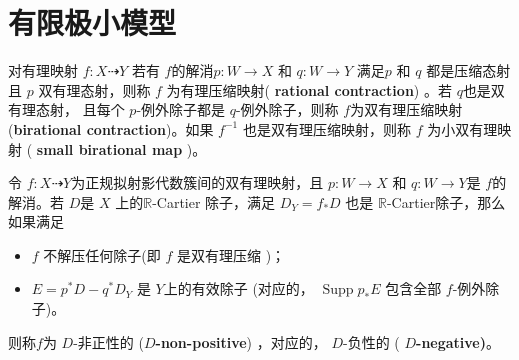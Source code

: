 \section{有限极小模型}

\begin{definition}
	\citet[\S 2]{haconSarkisovProgram2012} 对有理映射 $f:X\dashrightarrow Y$  若有 $f$的解消$p:W\to X$ 和 $q:W\to Y$ 满足$p$  和 $q$ 都是压缩态射且 $p$ 双有理态射，则称 $f$ 为有理压缩映射( \textbf{rational contraction})  。若 $ q$也是双有理态射， 且每个 $p$-例外除子都是 $q$-例外除子，则称 $f$为双有理压缩映射 (\textbf{birational contraction})。如果 $f^{-1}$ 也是双有理压缩映射，则称 $f$ 为小双有理映射   ( \textbf{small birational map} )。
\end{definition}

\begin{definition}\label{negativemap}
	\citet[Definition 3.6.1]{BCHM10}令 $f:X\dashrightarrow Y$为正规拟射影代数簇间的双有理映射，且 $p:W\to X$ 和 $q:W\to Y$是 $f$的解消。若 $D$是 $X$ 上的$\mathbb{R}$-Cartier 除子，满足  $D_{Y}=f_*D$ 也是 $\mathbb{R}$-Cartier除子，那么如果满足
	\begin{itemize}
		\item $f$ 不解压任何除子(即 $f$ 是双有理压缩 )；
		\item $E=p^{*}D-q^*D_Y$ 是  $Y$上的有效除子 (对应的， $\operatorname{Supp}p_*E$ 包含全部 $f$-例外除子)。
	\end{itemize}
 则称$f$为 $D$-非正性的  (\textbf{$D$-non-positive}) ，对应的， $D$-负性的 ( \textbf{$D$-negative)}。
\end{definition}

